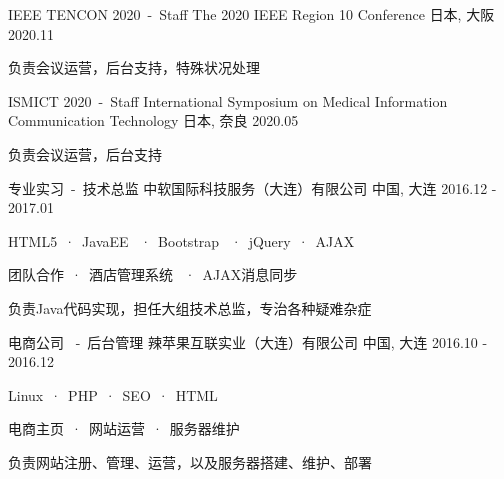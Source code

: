

\begin{cventries}

  \cventrywork
    {IEEE TENCON 2020\ -\ Staff} %
    {The 2020 IEEE Region 10 Conference} %
    {日本, 大阪} %
    {2020.11} %
    {
      \begin{cvitems} %
        \item {负责会议运营，后台支持，特殊状况处理}
      \end{cvitems}
    }

  \cventrywork
    {ISMICT 2020\ -\ Staff} %
    {International Symposium on Medical Information Communication Technology} %
    {日本, 奈良} %
    {2020.05} %
    {
      \begin{cvitems} %
        \item {负责会议运营，后台支持}
      \end{cvitems}
    }

  \cventrywork
    {专业实习\ -\ 技术总监} %
    {中软国际科技服务（大连）有限公司} %
    {中国, 大连} %
    {2016.12 - 2017.01} %
    {
      \begin{cvitems} %
        \item {HTML5\ ·\ JavaEE \ ·\ Bootstrap \ ·\ jQuery\ ·\ AJAX}
        \item {团队合作\ ·\ 酒店管理系统 \ ·\ AJAX消息同步}
        \item {负责Java代码实现，担任大组技术总监，专治各种疑难杂症}
      \end{cvitems}
    }
    
  \cventrywork
    {电商公司 \ -\ 后台管理} %
    {辣苹果互联实业（大连）有限公司} %
    {中国, 大连} %
    {2016.10 - 2016.12} %
    {
      \begin{cvitems} %
        \item {Linux\ ·\ PHP\ ·\ SEO\ ·\ HTML}
        \item {电商主页\ ·\ 网站运营\ ·\ 服务器维护}
        \item {负责网站注册、管理、运营，以及服务器搭建、维护、部署}
      \end{cvitems}
    }
    
\end{cventries}